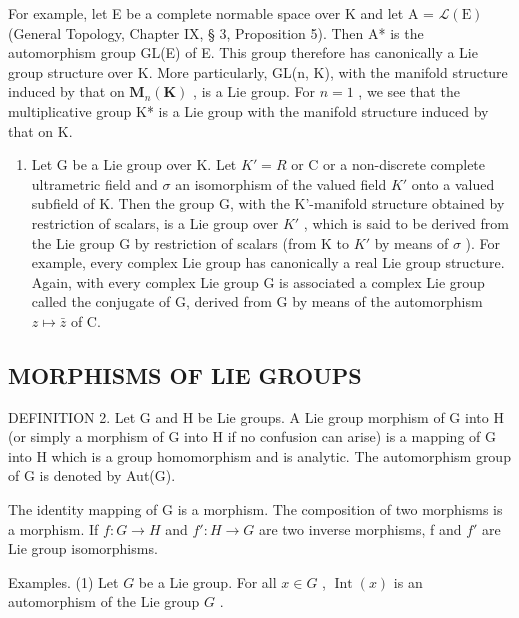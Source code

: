 For example, let E be a complete normable space over K and let A = \(\mathcal{L}(\mathrm{E})\) (General Topology, Chapter IX, § 3, Proposition 5). Then A* is the automorphism group GL(E) of E. This group therefore has canonically a Lie group structure over K. More particularly, GL(n, K), with the manifold structure induced by that on \(\mathbf{M}_{n}(\mathbf{K})\) , is a Lie group. For \(n = 1\) , we see that the multiplicative group K* is a Lie group with the manifold structure induced by that on K.

\begin{enumerate}
\def\labelenumi{(\arabic{enumi})}
\setcounter{enumi}{2}
\tightlist
\item
  Let G be a Lie group over K. Let \(K' = R\) or C or a non-discrete complete ultrametric field and \(\sigma\) an isomorphism of the valued field \(K'\) onto a valued subfield of K. Then the group G, with the K'-manifold structure obtained by restriction of scalars, is a Lie group over \(K'\) , which is said to be derived from the Lie group G by restriction of scalars (from K to \(K'\) by means of \(\sigma\) ). For example, every complex Lie group has canonically a real Lie group structure. Again, with every complex Lie group G is associated a complex Lie group called the conjugate of G, derived from G by means of the automorphism \(z \mapsto \bar{z}\) of C.
\end{enumerate}

\subsection{MORPHISMS OF LIE GROUPS}

DEFINITION 2. Let G and H be Lie groups. A Lie group morphism of G into H (or simply a morphism of G into H if no confusion can arise) is a mapping of G into H which is a group homomorphism and is analytic. The automorphism group of G is denoted by Aut(G).

The identity mapping of G is a morphism. The composition of two morphisms is a morphism. If \(f: G \to H\) and \(f': H \to G\) are two inverse morphisms, f and \(f'\) are Lie group isomorphisms.

Examples. (1) Let \(G\) be a Lie group. For all \(x \in G\) , \(\operatorname{Int}(x)\) is an automorphism of the Lie group \(G\) .

